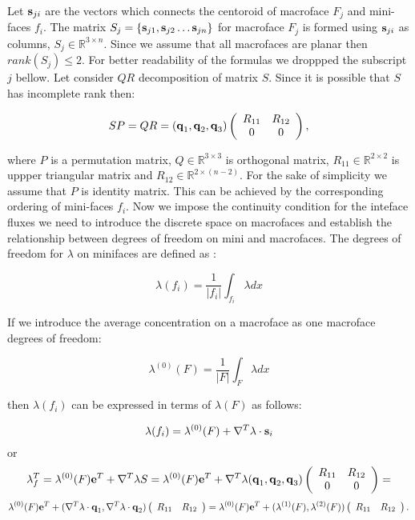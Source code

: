 Let $\boldsymbol{\mathbf{s}}_{ji}$ are the vectors which connects the centoroid of macroface $F_j$ and
mini-faces $f_i$.
The matrix $S_j=\{ \vect s_{j1}, \vect s_{j2} \dots \vect s_{jn}\}$ for macroface $F_j$
is formed using $\boldsymbol{\mathbf{s}}_{ji}$ as columns, $S_j \in {\mathbb R}^{3\times n}$. Since we assume
that all macrofaces are planar then $rank(S_j) \le 2$. For better readability of the formulas we droppped the subscript $j$ bellow.
Let consider $QR$ decomposition of matrix $S$. Since it is possible that $S$ has incomplete rank then:

$$ S P = QR=(\boldsymbol{\mathbf{q}}_1, \boldsymbol{\mathbf{q}}_2, \boldsymbol{\mathbf{q}}_3)
\left(
\begin{array}{cc}
R_{11} & R_{12}\\
0 & 0
\end{array}
\right),$$

\noindent where $P$ is a permutation matrix, $Q \in \mathbb R^{3\times 3}$ is orthogonal matrix,
$R_{11}\in \mathbb R^{2\times 2}$ is uppper triangular matrix and $R_{12} \in \mathbb R^{2\times(n-2)}$.
For the sake of simplicity we assume that $P$ is identity matrix. This can be achieved by
the corresponding ordering of mini-faces $f_i$. Now we impose the continuity condition for the inteface fluxes we need to introduce the discrete space on macrofaces and establish
the relationship between degrees of freedom on mini and macrofaces. The degrees of freedom for $\lambda$ on minifaces are defined as :

$$\lambda(f_i) = \frac{1}{|f_i|}\int_{f_i} \lambda dx$$

If we introduce the average concentration on a macroface as one macroface degrees of freedom:

$$\lambda^{(0)}(F) = \frac{1}{|F|}\int_{F} \lambda dx$$

then $\lambda(f_i)$ can be expressed in terms of $\lambda(F)$ as follows:

$$\lambda(f_i) = \lambda^{(0)}(F) + \nabla^T \lambda \cdot \boldsymbol{\mathbf{s}}_i$$
or
$$\lambda_f^T =  \lambda^{(0)}(F) \boldsymbol{\mathbf{e}}^T + \nabla^T \lambda S =
\lambda^{(0)}(F) \boldsymbol{\mathbf{e}}^T + \nabla^T \lambda (\boldsymbol{\mathbf{q}}_1, \boldsymbol{\mathbf{q}}_2, \boldsymbol{\mathbf{q}}_3)
\left(
\begin{array}{cc}
R_{11} & R_{12}\\
0 & 0
\end{array}
\right) = $$
$$\lambda^{(0)}(F) \boldsymbol{\mathbf{e}}^T  + (\nabla^T \lambda  \cdot  \boldsymbol{\mathbf{q}}_1, \nabla^T \lambda  \cdot  \boldsymbol{\mathbf{q}}_2) \left(
\begin{array}{cc}
R_{11} & R_{12}
\end{array}
\right) = \lambda^{(0)}(F) \boldsymbol{\mathbf{e}}^T + (\lambda^{(1)}(F),\lambda^{(2)}(F)) \left(
\begin{array}{cc}
R_{11} & R_{12}
\end{array}
\right).$$

